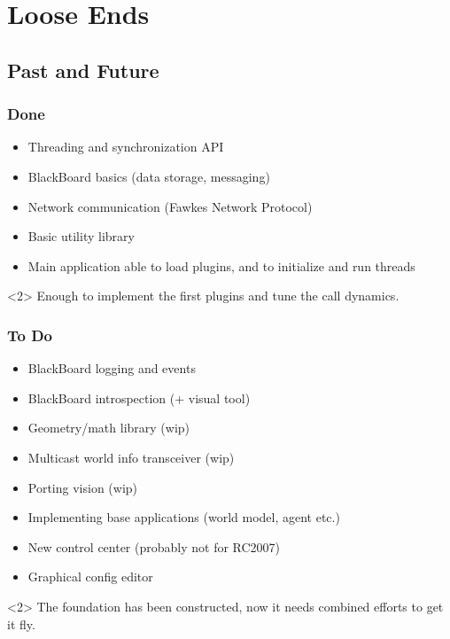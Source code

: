 %
%
%

\section{Loose Ends}


\subsection{Past and Future}
\begin{frame}
  \frametitle{Done}
  \begin{itemize}
  \item Threading and synchronization API
  \item BlackBoard basics (data storage, messaging)
  \item Network communication (Fawkes Network Protocol)
  \item Basic utility library
  \item Main application able to load plugins, and to initialize and run threads
  \end{itemize}
  \begin{block}<2>{}
    Enough to implement the first plugins and tune the call dynamics.
  \end{block}
\end{frame}

\begin{frame}
  \frametitle{To Do}
  \begin{itemize}
  \item BlackBoard logging and events
  \item BlackBoard introspection (+ visual tool)
  \item Geometry/math library (wip)
  \item Multicast world info transceiver (wip)
  \item Porting vision (wip)
  \item Implementing base applications (world model, agent etc.)
  \item New control center (probably not for RC2007)
  \item Graphical config editor
  \end{itemize}
  \begin{block}<2>{}
    The foundation has been constructed, now it needs combined efforts
    to get it fly.
  \end{block}
\end{frame}

